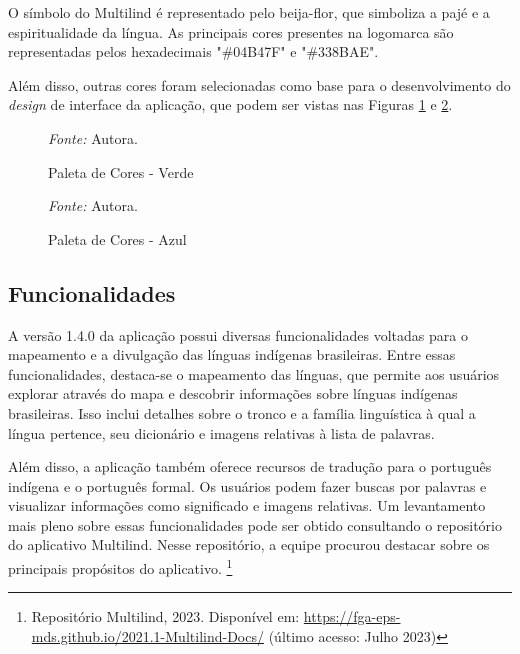O símbolo do Multilind é representado pelo beija-flor, que simboliza a pajé e a espiritualidade da língua. As principais cores presentes na logomarca são representadas pelos hexadecimais "\#04B47F" e "\#338BAE".

Além disso, outras cores foram selecionadas como base para o desenvolvimento do \textit{design} de interface da aplicação, que podem ser vistas nas Figuras \ref{fig16} e \ref{fig17}.

\begin{figure}[h!]
	\centering
	\caption{Paleta de Cores - Verde}
	\begin{tablenotes}[flushleft]
		\centering
		\item \textit{Fonte:} Autora.
	\end{tablenotes}
	\label{fig16}
\end{figure}

\begin{figure}[h!]
	\centering
	\caption{Paleta de Cores - Azul}
	\begin{tablenotes}[flushleft]
		\centering
		\item \textit{Fonte:} Autora.
	\end{tablenotes}
	\label{fig17}
\end{figure}

\subsection{Funcionalidades}
\label{Funcionalidades}
A versão 1.4.0 da aplicação possui diversas funcionalidades voltadas para o mapeamento e a divulgação das línguas indígenas brasileiras. Entre essas funcionalidades, destaca-se o mapeamento das línguas, que permite aos usuários 
explorar através do mapa e descobrir informações sobre línguas indígenas brasileiras. Isso inclui detalhes sobre o tronco e a família linguística à qual a língua pertence, seu dicionário e imagens relativas à lista de palavras.

Além disso, a aplicação também oferece recursos de tradução para o português indígena e o português formal. Os usuários podem fazer buscas por palavras e visualizar informações como significado e imagens relativas. Um levantamento 
mais pleno sobre essas funcionalidades pode ser obtido consultando o repositório do aplicativo Multilind. Nesse repositório, a equipe procurou destacar sobre os principais propósitos do aplicativo. \footnote{Repositório Multilind, 2023. Disponível
em: \url{https://fga-eps-mds.github.io/2021.1-Multilind-Docs/} (último acesso: Julho 2023)}

